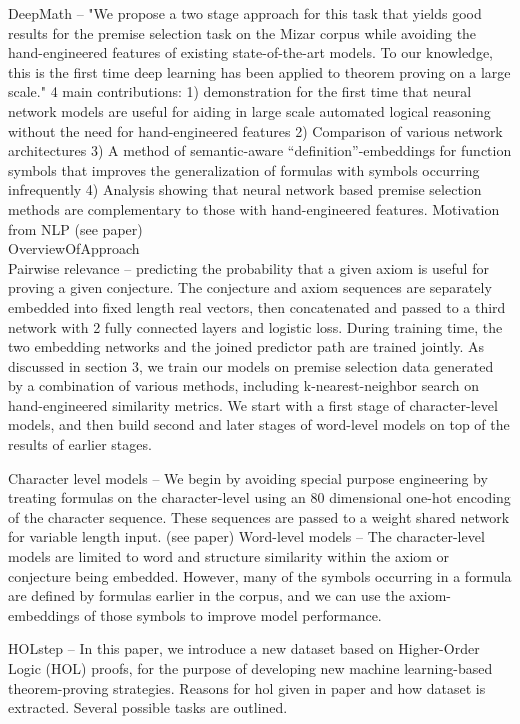 \documentclass{article}
\begin{document}
DeepMath \cite{DeepMath} --  "We propose a two stage approach for this task
that yields good results for the premise selection task on the Mizar corpus
while avoiding the hand-engineered features of existing state-of-the-art
models. To our knowledge, this is the first time deep learning has been applied
to theorem proving on a large scale." 4 main contributions: 1) demonstration
for the first time that neural network models are useful for aiding in large
scale automated logical reasoning without the need for hand-engineered features
2) Comparison of various network architectures 3) A method of semantic-aware
“definition”-embeddings for function symbols that improves the generalization
of formulas with symbols occurring infrequently 4) Analysis showing that neural
network based premise selection methods are complementary to those with
hand-engineered features. Motivation from NLP (see paper)\\
OverviewOfApproach\\
Pairwise relevance -- predicting the probability that a given axiom is useful
for proving a given conjecture. The conjecture and axiom sequences are
separately embedded into fixed length real vectors, then concatenated and
passed to a third network with 2 fully connected layers and logistic loss.
During training time, the two embedding networks and the joined predictor path
are trained jointly. As discussed in section 3, we train our models on premise
selection data generated by a combination of various methods, including
k-nearest-neighbor search on hand-engineered similarity metrics. We start with
a first stage of character-level models, and then build second and later stages
of word-level models on top of the results of earlier stages.

Character level models -- We begin by avoiding special purpose engineering by
treating formulas on the character-level using an 80 dimensional one-hot
encoding of the character sequence. These sequences are passed to a weight
shared network for variable length input. (see paper)
Word-level models -- The character-level models are limited to word and
structure similarity within the axiom or conjecture being embedded.  However,
many of the symbols occurring in a formula are defined by formulas earlier in
the corpus, and we can use the axiom-embeddings of those symbols to improve
model performance.

HOLstep \cite{HolStep} -- In this paper, we introduce a new dataset based on
Higher-Order Logic (HOL) proofs, for the purpose of developing new machine
learning-based theorem-proving strategies. Reasons for hol given in paper and
how dataset is extracted. Several possible tasks are outlined.
\end{document}
